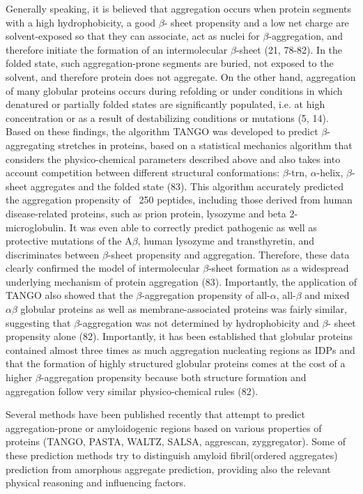 Generally speaking, it is believed that aggregation occurs when protein segments with a high hydrophobicity, a good $\beta$-
sheet propensity and a low net charge are solvent-exposed so that they can associate, act as nuclei for $\beta$-aggregation, and
therefore initiate the formation of an intermolecular $\beta$-sheet (21, 78-82). In the folded state, such aggregation-prone segments are
buried, not exposed to the solvent, and therefore protein does not aggregate. On the other hand, aggregation of many globular
proteins occurs during refolding or under conditions in which denatured or partially folded states are significantly populated, i.e.
at high concentration or as a result of destabilizing conditions or mutations (5, 14). Based on these findings, the algorithm
TANGO was developed to predict $\beta$-aggregating stretches in proteins, based on a statistical mechanics algorithm that considers
the physico-chemical parameters described above and also takes into account competition between different structural
conformations: $\beta$-trn, $\alpha$-helix, $\beta$-sheet aggregates and the folded state (83). This algorithm accurately predicted the aggregation
propensity of ~250 peptides, including those derived from human disease-related proteins, such as prion protein, lysozyme and
beta 2-microglobulin. It was even able to correctly predict pathogenic as well as protective mutations of the A$\beta$, human lysozyme
and transthyretin, and discriminates between $\beta$-sheet propensity and aggregation. Therefore, these data clearly confirmed the
model of intermolecular $\beta$-sheet formation as a widespread underlying mechanism of protein aggregation (83). Importantly, the
application of TANGO also showed that the $\beta$-aggregation propensity of all-$\alpha$, all-$\beta$ and mixed $\alpha\beta$ globular proteins as well as
membrane-associated proteins was fairly similar, suggesting that $\beta$-aggregation was not determined by hydrophobicity and $\beta$-
sheet propensity alone (82). Importantly, it has been established that globular proteins contained almost three times as much
aggregation nucleating regions as IDPs and that the formation of highly structured globular proteins comes at the cost of a higher
$\beta$-aggregation propensity because both structure formation and aggregation follow very similar physico-chemical rules (82).







Several methods have been published recently that attempt to predict aggregation-prone or amyloidogenic regions based on various properties of proteins (TANGO, PASTA, WALTZ, SALSA, aggrescan, zyggregator).
Some of these prediction methods try to distinguish amyloid fibril(ordered aggregates) prediction from amorphous aggregate prediction, providing also the relevant physical reasoning and influencing factors.

